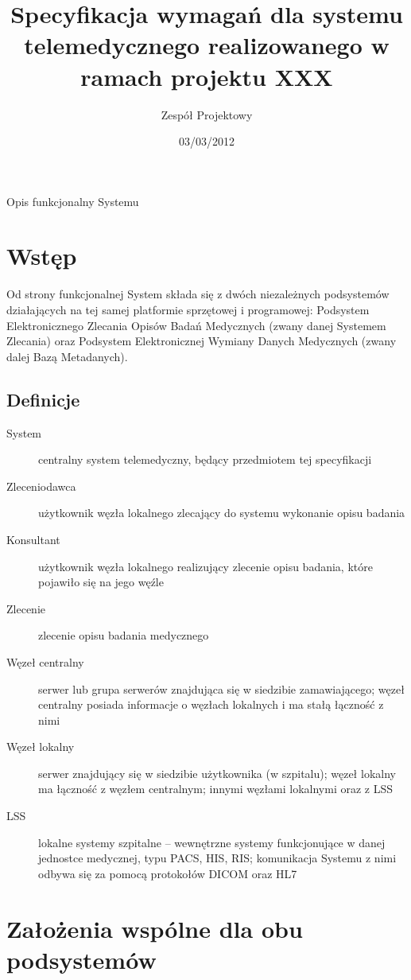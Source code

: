 \documentclass[a4paper]{article}
\title{Specyfikacja wymagań dla systemu telemedycznego realizowanego w ramach projektu XXX}
\author{Zespół Projektowy}
\date{03/03/2012}
\begin{document}
\maketitle
\tableofcontents

Opis funkcjonalny Systemu

\section{Wstęp}

Od strony funkcjonalnej System składa się z dwóch niezależnych podsystemów działających na tej samej platformie sprzętowej i programowej: Podsystem Elektronicznego Zlecania Opisów Badań Medycznych (zwany danej Systemem Zlecania) oraz Podsystem Elektronicznej Wymiany Danych Medycznych (zwany dalej Bazą Metadanych).

\subsection{Definicje}

\begin{description}
\item[System] centralny system telemedyczny, będący przedmiotem tej specyfikacji
\item[Zleceniodawca] użytkownik węzła lokalnego zlecający do systemu wykonanie opisu badania
\item[Konsultant] użytkownik węzła lokalnego realizujący zlecenie opisu badania, które pojawiło się na jego węźle
\item[Zlecenie] zlecenie opisu badania medycznego
\item[Węzeł centralny] serwer lub grupa serwerów znajdująca się w siedzibie zamawiającego; węzeł centralny posiada informacje o węzłach lokalnych i ma stałą łączność z nimi
\item[Węzeł lokalny] serwer znajdujący się w siedzibie użytkownika (w szpitalu); węzeł lokalny ma łączność z węzłem centralnym; innymi węzłami lokalnymi oraz z LSS
\item[LSS] lokalne systemy szpitalne -- wewnętrzne systemy funkcjonujące w danej jednostce medycznej, typu PACS, HIS, RIS; komunikacja Systemu z nimi odbywa się za pomocą protokołów DICOM oraz HL7
\end{description}

\section{Założenia wspólne dla obu podsystemów}
\end{document}
